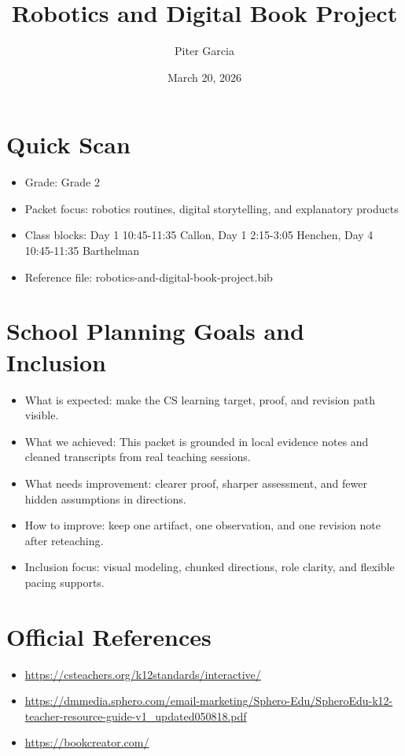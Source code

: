 \documentclass[11pt]{article}
\title{Robotics and Digital Book Project}
\author{Piter Garcia}
\date{March 20, 2026}
\begin{document}
\maketitle
\section*{Quick Scan}
\begin{itemize}[leftmargin=*]
\item Grade: Grade 2
\item Packet focus: robotics routines, digital storytelling, and explanatory products
\item Class blocks: Day 1 10:45-11:35 Callon, Day 1 2:15-3:05 Henchen, Day 4 10:45-11:35 Barthelman
\item Reference file: robotics-and-digital-book-project.bib
\end{itemize}
\section*{School Planning Goals and Inclusion}
\begin{itemize}[leftmargin=*]
\item What is expected: make the CS learning target, proof, and revision path visible.
\item What we achieved: This packet is grounded in local evidence notes and cleaned transcripts from real teaching sessions.
\item What needs improvement: clearer proof, sharper assessment, and fewer hidden assumptions in directions.
\item How to improve: keep one artifact, one observation, and one revision note after reteaching.
\item Inclusion focus: visual modeling, chunked directions, role clarity, and flexible pacing supports.
\end{itemize}
\section*{Official References}
\begin{itemize}[leftmargin=*]
\item \url{https://csteachers.org/k12standards/interactive/}
\item \url{https://dmmedia.sphero.com/email-marketing/Sphero-Edu/SpheroEdu-k12-teacher-resource-guide-v1_updated050818.pdf}
\item \url{https://bookcreator.com/}
\end{itemize}
\end{document}
